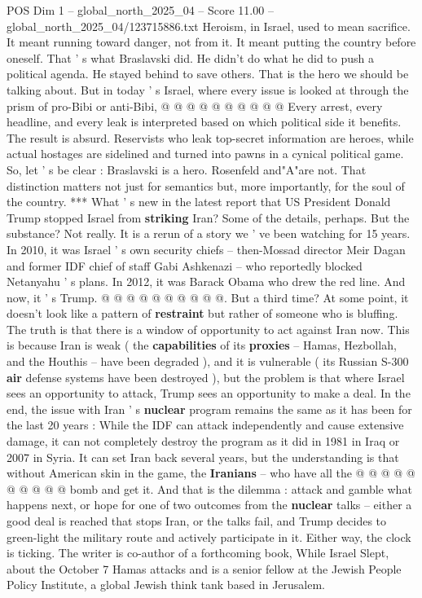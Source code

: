 \begin{textsample}{POS Dim 1 – global\_north\_2025\_04 – Score 11.00 – global\_north\_2025\_04/123715886.txt}
Heroism, in Israel, used to mean sacrifice.
It meant running toward danger, not from it.
It meant putting the country before oneself.
That ' s what Braslavski did.
He didn't do what he did to push a political agenda.
He stayed behind to save others.
That is the hero we should be talking about.
But in today ' s Israel, where every issue is looked at through the prism of pro-Bibi or anti-Bibi, @ @ @ @ @ @ @ @ @ @ Every arrest, every headline, and every leak is interpreted based on which political side it benefits.
The result is absurd.
Reservists who leak top-secret information are heroes, while actual hostages are sidelined and turned into pawns in a cynical political game.
So, let ' s be clear : Braslavski is a hero.
Rosenfeld and"A"are not.
That distinction matters not just for semantics but, more importantly, for the soul of the country. *** What ' s new in the latest report that US President Donald Trump stopped Israel from \textbf{striking} Iran?
Some of the details, perhaps.
But the substance?
Not really.
It is a rerun of a story we ' ve been watching for 15 years.
In 2010, it was Israel ' s own security chiefs -- then-Mossad director Meir Dagan and former IDF chief of staff Gabi Ashkenazi -- who reportedly blocked Netanyahu ' s plans.
In 2012, it was Barack Obama who drew the red line.
And now, it ' s Trump. @ @ @ @ @ @ @ @ @ @.
But a third time?
At some point, it doesn't look like a pattern of \textbf{restraint} but rather of someone who is bluffing.
The truth is that there is a window of opportunity to act against Iran now.
This is because Iran is weak ( the \textbf{capabilities} of its \textbf{proxies} -- Hamas, Hezbollah, and the Houthis -- have been degraded ), and it is vulnerable ( its Russian S-300 \textbf{air} defense systems have been destroyed ), but the problem is that where Israel sees an opportunity to attack, Trump sees an opportunity to make a deal.
In the end, the issue with Iran ' s \textbf{nuclear} program remains the same as it has been for the last 20 years : While the IDF can attack independently and cause extensive damage, it can not completely destroy the program as it did in 1981 in Iraq or 2007 in Syria.
It can set Iran back several years, but the understanding is that without American skin in the game, the \textbf{Iranians} -- who have all the @ @ @ @ @ @ @ @ @ @ bomb and get it.
And that is the dilemma : attack and gamble what happens next, or hope for one of two outcomes from the \textbf{nuclear} talks -- either a good deal is reached that stops Iran, or the talks fail, and Trump decides to green-light the military route and actively participate in it.
Either way, the clock is ticking.
The writer is co-author of a forthcoming book, While Israel Slept, about the October 7 Hamas attacks and is a senior fellow at the Jewish People Policy Institute, a global Jewish think tank based in Jerusalem.

\end{textsample}
